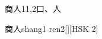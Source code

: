 \begin{entry}{商人}{11,2}{⼝、⼈}
  \begin{phonetics}{商人}{shang1 ren2}[][HSK 2]
  \end{phonetics}
\end{entry}
